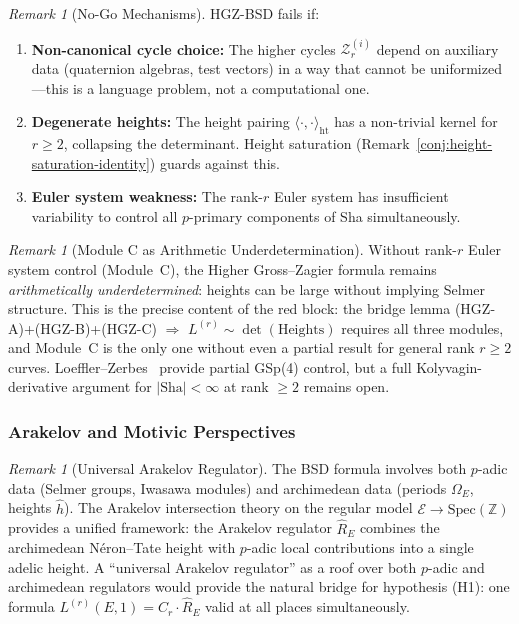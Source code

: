 \documentclass[aps,prd,twocolumn,superscriptaddress,nofootinbib,floatfix]{revtex4-2}
\theoremstyle{definition}
\theoremstyle{remark}
\newtheorem{remark}[theorem]{Remark}
\begin{document}
\begin{remark}[No-Go Mechanisms]\label{rem:hgz-nogo}
HGZ-BSD fails if:
\begin{enumerate}
\item \textbf{Non-canonical cycle choice:} The higher cycles $\mathcal{Z}_r^{(i)}$ depend on auxiliary data (quaternion algebras, test vectors) in a way that cannot be uniformized---this is a language problem, not a computational one.
\item \textbf{Degenerate heights:} The height pairing $\langle \cdot, \cdot \rangle_{\mathrm{ht}}$ has a non-trivial kernel for $r \geq 2$, collapsing the determinant. Height saturation (Remark~\ref{conj:height-saturation-identity}) guards against this.
\item \textbf{Euler system weakness:} The rank-$r$ Euler system has insufficient variability to control all $p$-primary components of Sha simultaneously.
\end{enumerate}
\end{remark}

\begin{remark}[Module C as Arithmetic Underdetermination]\label{rem:module-c-underdetermined}
Without rank-$r$ Euler system control (Module~C), the Higher Gross--Zagier formula remains \emph{arithmetically underdetermined}: heights can be large without implying Selmer structure. This is the precise content of the red block: the bridge lemma (HGZ-A)+(HGZ-B)+(HGZ-C) $\Rightarrow$ $L^{(r)} \sim \det(\text{Heights})$ requires all three modules, and Module~C is the only one without even a partial result for general rank $r \geq 2$ curves. Loeffler--Zerbes~\cite{LoefflerZerbes2024} provide partial GSp(4) control, but a full Kolyvagin-derivative argument for $|\mathrm{Sha}| < \infty$ at rank $\geq 2$ remains open.
\end{remark}

\subsubsection{Arakelov and Motivic Perspectives}

\begin{remark}[Universal Arakelov Regulator]
\label{rem:arakelov-regulator}
The BSD formula involves both $p$-adic data (Selmer groups, Iwasawa modules) and archimedean data (periods $\Omega_E$, heights $\hat{h}$). The Arakelov intersection theory on the regular model $\mathcal{E} \to \mathrm{Spec}(\mathbb{Z})$ provides a unified framework: the Arakelov regulator $\hat{R}_E$ combines the archimedean Néron--Tate height with $p$-adic local contributions into a single adelic height. A ``universal Arakelov regulator'' as a roof over both $p$-adic and archimedean regulators would provide the natural bridge for hypothesis (H1): one formula $L^{(r)}(E,1) = C_r \cdot \hat{R}_E$ valid at all places simultaneously.
\end{remark}
\end{document}
